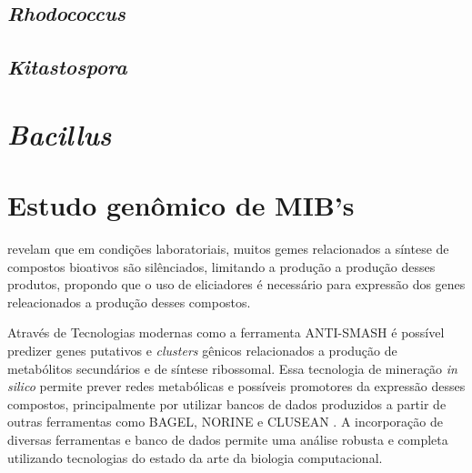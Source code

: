 \subsection{\textit{Rhodococcus}}
\subsection{\textit{Kitastospora}}
\section{\textit{Bacillus}}

\section{Estudo genômico de MIB's}

 revelam que em condições laboratoriais, muitos gemes relacionados a síntese de
compostos bioativos são silênciados, limitando a produção a produção desses produtos, propondo
que o uso de eliciadores é necessário para expressão dos genes releacionados a produção desses 
compostos.

Através de Tecnologias modernas como a ferramenta ANTI-SMASH \cite{antismash} é possível predizer
genes putativos e \textit{clusters} gênicos relacionados a produção de metabólitos secundários
e de síntese ribossomal. Essa tecnologia de mineração \textit{in silico} permite prever redes
metabólicas e possíveis promotores da expressão desses compostos, principalmente por utilizar
bancos de dados produzidos a partir de outras ferramentas como BAGEL\cite{bagel2,bagel3},
NORINE \cite{norine} e CLUSEAN \cite{clusean}. A incorporação de diversas ferramentas e banco de dados
permite uma análise robusta e completa utilizando tecnologias do estado da arte da biologia computacional.

